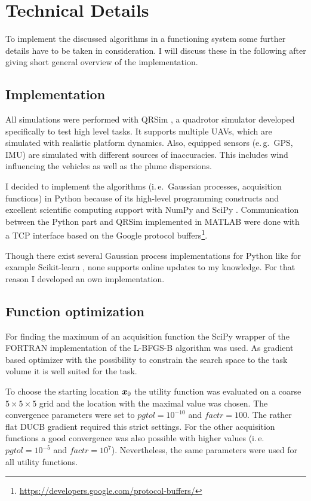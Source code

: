 \chapter{Technical Details}\label{sec:tech}
To implement the discussed algorithms in a functioning system some further 
details have to be taken in consideration. I will discuss these in the following 
after giving short general overview of the implementation.

\section{Implementation}
All simulations were performed with QRSim \parencite{denardi2013rn}, a quadrotor 
simulator developed specifically to test high level tasks. It supports multiple 
UAVs, which are simulated with realistic platform dynamics.  Also, equipped 
sensors (e.\,g.~GPS, IMU) are simulated with different sources of inaccuracies.  
This includes wind influencing the vehicles as well as the plume dispersions.

I decided to implement the algorithms (i.\,e.~Gaussian processes, acquisition 
functions) in Python because of its high-level programming constructs and 
excellent scientific computing support with NumPy and SciPy 
\parencite{Oliphant:2007dm}. Communication between the Python part and QRSim 
implemented in MATLAB were done with a TCP interface based on the Google 
protocol 
buffers\footnote{\url{https://developers.google.com/protocol-buffers/}}.

Though there exist several Gaussian process implementations for Python like for 
example Scikit-learn \parencite[i.\,e.][]{scikit-learn}, none supports online 
updates to my knowledge.  For that reason I developed an own implementation.

\section{Function optimization}\label{sec:fnopt}
For finding the maximum of an acquisition function the SciPy wrapper of the 
\mbox{FORTRAN} implementation of the \mbox{L-BFGS-B} algorithm 
\parencite{Byrd:2006iv, Zhu:1997br} was used.  As gradient based optimizer with 
the possibility to constrain the search space to the task volume it is well 
suited for the task.

To choose the starting location $\bm{x}_0$ the utility function was evaluated on 
a coarse $5 \times 5 \times 5$ grid and the location with the maximal value was 
chosen. The convergence parameters were set to $\mathit{pgtol} = 10^{-10}$ and 
$\mathit{factr} = 100$. The rather flat DUCB gradient required this strict 
settings. For the other acquisition functions a good convergence was also 
possible with higher values (i.\,e.~$\mathit{pgtol} = 10^{-5}$ and $\mathit{factr} 
= 10^7$).  Nevertheless, the same parameters were used for all utility 
functions.

